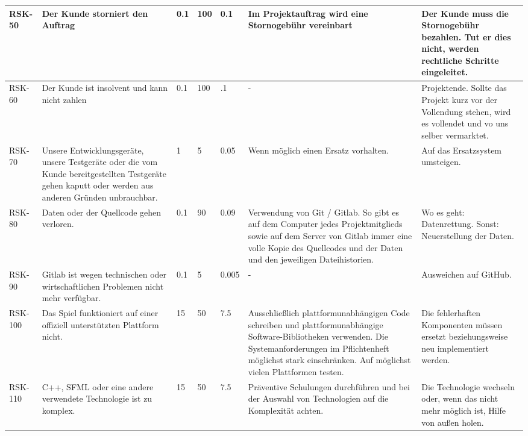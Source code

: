 \begin{landscape}
\begin{longtable}{|p{1.5cm}|p{4.5cm}|p{0.4cm}|p{0.4cm}|p{0.8cm}|p{4.5cm}|p{4.5cm}|}
		\\ \hline

		RSK-50 	& Der Kunde storniert den Auftrag 
				& 0.1 	& 100 	& 0.1 	& Im Projektauftrag wird eine Stornogebühr vereinbart 
								& Der Kunde muss die Stornogebühr bezahlen. Tut er dies nicht, werden rechtliche Schritte eingeleitet.

		\\ \hline
		
		RSK-60 	& Der Kunde ist insolvent und kann nicht zahlen
				& 0.1 	& 100 	& .1 	& - 	& Projektende. Sollte das Projekt kurz vor der Vollendung stehen, wird es vollendet und vo uns selber vermarktet.

		\\ \hline 

		RSK-70 	& Unsere Entwicklungsgeräte, unsere Testgeräte oder die vom Kunde bereitgestellten Testgeräte gehen kaputt oder werden aus anderen Gründen unbrauchbar.
				& 1 	& 5 	& 0.05 	& Wenn möglich einen Ersatz vorhalten.
								& Auf das Ersatzsystem umsteigen.

		\\ \hline

		RSK-80 	& Daten oder der Quellcode gehen verloren.
				& 0.1 	& 90 	& 0.09 	& Verwendung von Git / Gitlab. So gibt es auf dem Computer jedes Projektmitglieds sowie auf dem Server von Gitlab immer eine volle Kopie des Quellcodes und der Daten und den jeweiligen Dateihistorien.
								& Wo es geht: Datenrettung. Sonst: Neuerstellung der Daten.

		\\ \hline 

		RSK-90	& Gitlab ist wegen technischen oder wirtschaftlichen Problemen nicht mehr verfügbar.
				& 0.1 	& 5 	& 0.005 & - 	& Ausweichen auf GitHub.

		\\ \hline

		RSK-100	& Das Spiel funktioniert auf einer offiziell unterstützten Plattform nicht.
				& 15 	& 50 	& 7.5 	& Ausschließlich plattformunabhängigen Code schreiben und plattformunabhängige Software-Bibliotheken verwenden. Die Systemanforderungen im Pflichtenheft möglichst stark einschränken. Auf möglichst vielen Plattformen testen.
								& Die fehlerhaften Komponenten müssen ersetzt beziehungsweise neu implementiert werden.

		\\ \hline

		RSK-110	& C++, SFML oder eine andere verwendete Technologie ist zu komplex.
				& 15 	& 50 	& 7.5 	& Präventive Schulungen durchführen und bei der Auswahl von Technologien auf die Komplexität achten. 
								& Die Technologie wechseln oder, wenn das nicht mehr möglich ist, Hilfe von außen holen.


\end{longtable}
\end{landscape}
